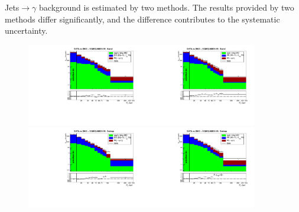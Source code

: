 Jets$\rightarrow\gamma$ background is estimated by two methods. The results provided by two methods differ significantly, and the difference contributes to the systematic uncertainty.

\begin{figure}[htb]
  \begin{center}
   \includegraphics[width=0.45\textwidth]{../figs/figs_v11/MUON_WGamma/PrepareYields/c_DATAvsBkgPlusSigMCc_MUON_WGamma_TEMPL_CHISO_UNblind__Barrel__phoEt.pdf}\includegraphics[width=0.45\textwidth]{../figs/figs_v11/MUON_WGamma/PrepareYields/c_DATAvsBkgPlusSigMCc_MUON_WGamma_TEMPL_SIHIH_UNblind__Barrel__phoEt.pdf}  \\
   \includegraphics[width=0.45\textwidth]{../figs/figs_v11/MUON_WGamma/PrepareYields/c_DATAvsBkgPlusSigMCc_MUON_WGamma_TEMPL_CHISO_UNblind__Endcap__phoEt.pdf}\includegraphics[width=0.45\textwidth]{../figs/figs_v11/MUON_WGamma/PrepareYields/c_DATAvsBkgPlusSigMCc_MUON_WGamma_TEMPL_SIHIH_UNblind__Endcap__phoEt.pdf}  \\

\end{center}
\end{figure}
